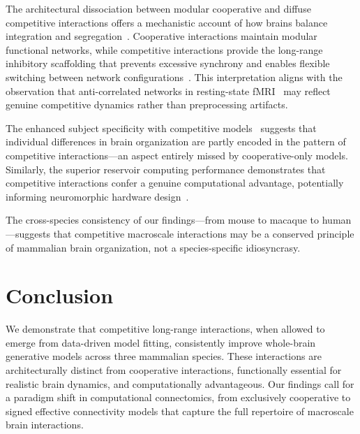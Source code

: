 \documentclass[11pt]{article}
\begin{document}
The architectural dissociation between modular cooperative and diffuse competitive interactions offers a mechanistic account of how brains balance integration and segregation~\citep{deco2015rethinking}.  Cooperative interactions maintain modular functional networks, while competitive interactions provide the long-range inhibitory scaffolding that prevents excessive synchrony and enables flexible switching between network configurations~\citep{shanahan2010metastable,deco2012ongoing}.  This interpretation aligns with the observation that anti-correlated networks in resting-state fMRI~\citep{fox2005human} may reflect genuine competitive dynamics rather than preprocessing artifacts.

The enhanced subject specificity with competitive models~\citep{amico2018fingerprint,finn2015connectomics} suggests that individual differences in brain organization are partly encoded in the pattern of competitive interactions---an aspect entirely missed by cooperative-only models.  Similarly, the superior reservoir computing performance demonstrates that competitive interactions confer a genuine computational advantage, potentially informing neuromorphic hardware design~\citep{maass2002real}.

The cross-species consistency of our findings---from mouse to macaque to human---suggests that competitive macroscale interactions may be a conserved principle of mammalian brain organization, not a species-specific idiosyncrasy.

\section{Conclusion}

We demonstrate that competitive long-range interactions, when allowed to emerge from data-driven model fitting, consistently improve whole-brain generative models across three mammalian species.  These interactions are architecturally distinct from cooperative interactions, functionally essential for realistic brain dynamics, and computationally advantageous.  Our findings call for a paradigm shift in computational connectomics, from exclusively cooperative to signed effective connectivity models that capture the full repertoire of macroscale brain interactions.



\end{document}
